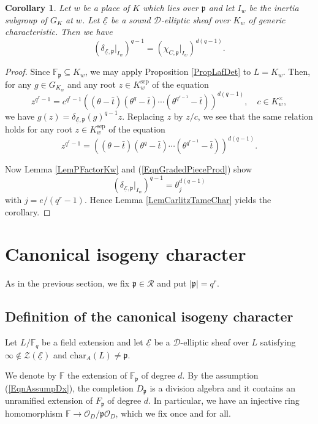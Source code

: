 \documentclass[10pt]{amsart}
\theoremstyle{plain}
\newtheorem{cor}[thm]{Corollary}
\theoremstyle{definition}
\newcommand{\chr}{\mathrm{char}}
\newcommand{\sep}{\mathrm{sep}}
\newcommand{\cO}{\mathcal{O}}
\newcommand{\cR}{\mathcal{R}}
\newcommand{\cZ}{\mathcal{Z}}
\newcommand{\ucE}{\underline{\mathcal{E}}}
\newcommand{\bF}{\mathbb{F}}
\newcommand{\sD}{\mathscr{D}}
\newcommand{\frp}{\mathfrak{p}}
\begin{document}
\begin{cor}\label{CorLafCarlitz}
	Let $w$ be a place of $K$ which lies over $\frp$ and let $I_w$ be the inertia subgroup of $G_K$ at $w$.
	Let $\ucE$ be a sound $\sD$-elliptic sheaf over $K_w$ of generic characteristic.
	Then we have 
	\[
	(\delta_{\ucE,\frp}|_{I_w})^{q-1}=(\chi_{C,\frp}|_{I_w})^{d(q-1)}.
	\]
\end{cor}
\begin{proof}
	Since $\bF_\frp\subseteq K_w$, we may apply Proposition \ref{PropLafDet} to $L=K_w$.
	Then, for any $g\in G_{K_w}$ and any root $z\in K_w^\sep$
	of the equation
	\[
	z^{q^r-1}=c^{q^r-1}((\theta-\bar{t})(\theta^q-\bar{t})\cdots (\theta^{q^{r-1}}-\bar{t}))^{d(q-1)},
	\quad c\in K_w^\times,
	\]
	we have $g(z)=\delta_{\ucE,\frp}(g)^{q-1}z$.
	Replacing $z$ by $z/c$, we see that the same relation holds for any root $z\in K_w^\sep$ of the equation
	\[
	z^{q^r-1}=((\theta-\bar{t})(\theta^q-\bar{t})\cdots (\theta^{q^{r-1}}-\bar{t}))^{d(q-1)}.
	\]
	
	
	Now Lemma \ref{LemPFactorKw} and (\ref{EqnGradedPieceProd}) show
	\[
	(\delta_{\ucE,\frp}|_{I_w})^{q-1}=\theta_j^{d(q-1)}
	\]
	with $j=e/(q^r-1)$.
	Hence Lemma \ref{LemCarlitzTameChar} yields the corollary.
\end{proof}





\section{Canonical isogeny character}\label{SecCanIsogChar}

As in the previous section, we fix $\frp\in \cR$ and put $|\frp|=q^r$.

\subsection{Definition of the canonical isogeny character}\label{SubsecDefCanIsogChar}

Let $L/\bF_q$ be a field extension and let $\ucE$ be a $\sD$-elliptic sheaf over $L$ satisfying $\infty\notin\cZ(\ucE)$ and $\chr_A(L)\neq \frp$.








We denote by $\bF$ the extension of $\bF_\frp$ of degree $d$. 
By the assumption (\ref{EqnAssumpDx}), the completion $D_\frp$ is a division algebra and
it contains an unramified extension of $F_\frp$ of degree $d$. 
In particular, we have an injective ring homomorphism $\bF\to \cO_{D}/\frp \cO_{D}$, which we fix once and for all.
\end{document}
